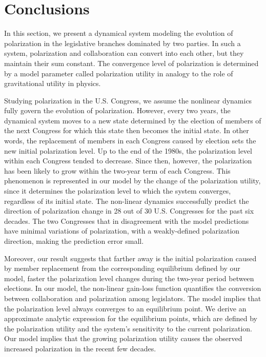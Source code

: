 \section{Conclusions}
In this section, we present a dynamical system modeling the evolution of polarization in the legislative branches dominated by two parties. In such a system, polarization and collaboration can convert into each other, but they maintain their sum constant. The convergence level of polarization is determined by a model parameter called polarization utility in analogy to the role of gravitational utility in physics.

Studying polarization in the U.S. Congress, we assume the nonlinear dynamics fully govern the evolution of polarization. However, every two years, the dynamical system moves to a new state determined by the election of members of the next Congress for which this state then becomes the initial state. In other words, the replacement of members in each Congress caused by election sets the new initial polarization level. Up to the end of the 1980s, the polarization level within each Congress tended to decrease. Since then, however, the polarization has been likely to grow within the two-year term of each Congress. This phenomenon is represented in our model by the change of the polarization utility, since it determines the polarization level to which the system converges, regardless of its initial state. The non-linear dynamics successfully predict the direction of polarization change in 28 out of 30 U.S. Congresses for the past six decades. The two Congresses that in disagreement with the model predictions have minimal variations of polarization, with a weakly-defined polarization direction, making the prediction error small.

Moreover, our result suggests that farther away is the initial polarization caused by member replacement from the corresponding equilibrium defined by our model, faster the polarization level changes during the two-year period between elections. In our model, the non-linear gain-loss function quantifies the conversion between collaboration and polarization among legislators. The model implies that the polarization level always converges to an equilibrium point. We derive an approximate analytic expression for the equilibrium points, which are defined by the polarization utility and the system's sensitivity to the current polarization. Our model implies that the growing polarization utility causes the observed increased polarization in the recent few decades.
